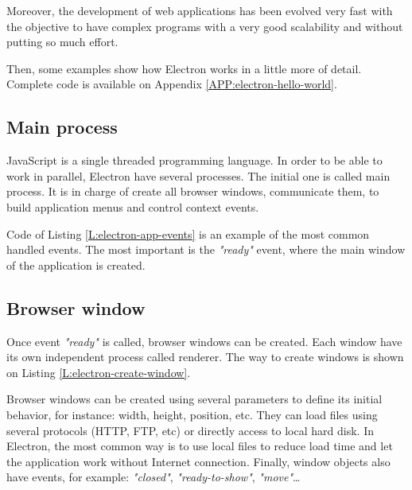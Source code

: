 Moreover, the development of web applications has been evolved very fast with
the objective to have complex programs with a very good scalability and without
putting so much effort.

Then, some examples show how Electron works in a little more of detail.
Complete code is available on Appendix \ref{APP:electron-hello-world}.

\subsection{Main process}

JavaScript is a single threaded programming language. In order to be able to
work in parallel, Electron have several processes. The initial one is called 
main process. It is in charge of create all browser windows, communicate them,
to build application menus and control context events.

\begin{codefigure}
\end{codefigure}

Code of Listing \ref{L:electron-app-events} is an example of the most common
handled events. The most important is the \textit{"ready"} event, where the
main window of the application is created.

\subsection{Browser window}

Once event \textit{"ready"} is called, browser windows can be created. Each
window have its own independent process called renderer. The way to create
windows is shown on Listing \ref{L:electron-create-window}.

\begin{codefigure}
\end{codefigure}

Browser windows can be created using several parameters to define its initial
behavior, for instance: width, height, position, etc. They can load files  
using several protocols (HTTP, FTP, etc) or directly access to local hard disk.
In Electron, the most common way is to use local files to reduce load time and
let the application work without Internet connection. Finally, window objects
also have events, for example: \textit{"closed"}, \textit{"ready-to-show"},
\textit{"move"}\dots

